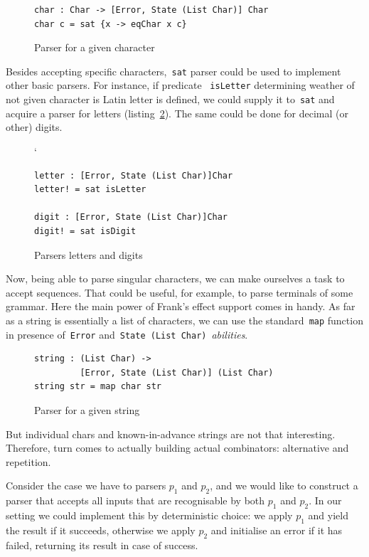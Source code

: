     \begin{figure}[h]
    \begin{lstlisting}
char : Char -> [Error, State (List Char)] Char
char c = sat {x -> eqChar x c}
    \end{lstlisting}
    \caption{Parser for a given character}
    \label{listing:parserCharCombo}
    \end{figure}

    Besides accepting specific characters,~\texttt{sat} parser could be used
    to implement other basic parsers. For instance, if predicate
    ~\texttt{isLetter} determining weather of not given character is Latin letter is defined, we could supply it to~\texttt{sat} and acquire a parser for letters (listing~\ref{listing:parserLetterCombo}). The same could be done for decimal
    (or other) digits.

    \begin{figure}[h]`
    \begin{lstlisting}
letter : [Error, State (List Char)]Char
letter! = sat isLetter

digit : [Error, State (List Char)]Char
digit! = sat isDigit
    \end{lstlisting}
    \caption{Parsers letters and digits}
    \label{listing:parserLetterCombo}
    \end{figure}

    Now, being able to parse singular characters, we can make ourselves a task
    to accept sequences. That could be useful, for example, to parse terminals of
    some grammar. Here the main power of Frank's effect support comes in handy.
    As far as a string is essentially a list of characters, we can use the
    standard~\texttt{map} function in presence of~\texttt{Error}
    and~\texttt{State (List Char)}~\emph{abilities}.

    \begin{figure}[h]
    \begin{lstlisting}
string : (List Char) ->
         [Error, State (List Char)] (List Char)
string str = map char str
    \end{lstlisting}
    \caption{Parser for a given string}
    \label{listing:parserStrCombo}
    \end{figure}

    But individual chars and known-in-advance strings are not that interesting. Therefore, turn comes to actually building actual combinators: alternative
    and repetition.

    Consider the case we have to parsers $p_1$ and $p_2$, and we would like to
    construct a parser that accepts all inputs that are recognisable by both
    $p_1$ and $p_2$. In our setting we could implement this by deterministic
    choice: we apply $p_1$ and yield the result if it succeeds, otherwise we
    apply $p_2$ and initialise an error if it has failed, returning its
    result in case of success.


